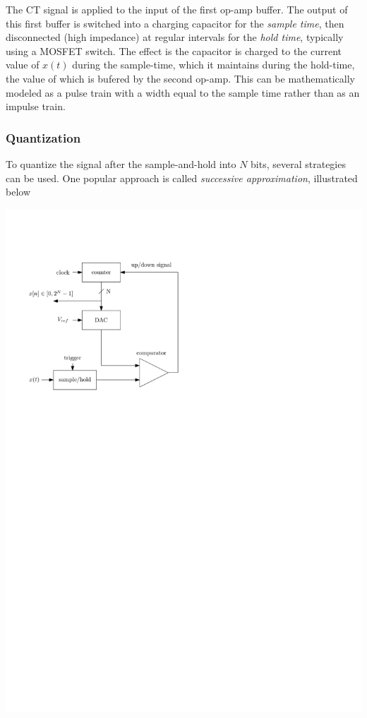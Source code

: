 The CT signal is applied to the input of the first op-amp buffer. The output of this first buffer is switched into a charging capacitor for the \emph{sample time}, then disconnected (high impedance) at regular intervals for the \emph{hold time}, typically using a MOSFET switch. The effect is the capacitor is charged to the current value of $x(t)$ during the sample-time, which it maintains during the hold-time, the value of which is bufered by the second op-amp. This can be mathematically modeled as a pulse train with a width equal to the sample time rather than as an impulse train.

\subsubsection{Quantization}

To quantize the signal after the sample-and-hold into $N$ bits, several strategies can be used. One popular approach is called \emph{successive approximation}, illustrated below

\begin{center}
  \includegraphics[scale=1]{graphics/sar.pdf}
\end{center}

